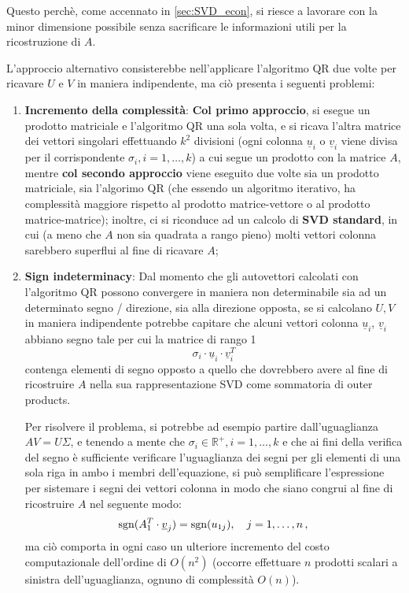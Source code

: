 Questo perchè, come accennato in \ref{sec:SVD_econ}, si riesce a lavorare con la 
minor dimensione possibile senza sacrificare le informazioni utili per la 
ricostruzione di $A$.

L'approccio alternativo consisterebbe nell'applicare l'algoritmo QR due volte 
per ricavare $U$ e $V$ in maniera indipendente, ma ciò presenta i seguenti 
problemi:
\begin{enumerate}
	\item \textbf{Incremento della complessità}: \textbf{Col primo approccio}, si 
esegue un prodotto matriciale e l'algoritmo QR una sola volta, e si ricava 
l'altra matrice dei vettori singolari effettuando $k^2$ divisioni (ogni colonna 
$\underline{u}_i$ o $\underline{v}_i$ viene divisa per il corrispondente 
$\sigma_i, i = 1, \ldots, k$) a cui segue un prodotto con la matrice $A$, mentre 
\textbf{col secondo approccio} viene eseguito due volte sia un prodotto matriciale, 
sia l'algorimo QR (che essendo un algoritmo iterativo, ha complessità maggiore 
rispetto al prodotto matrice-vettore o al prodotto matrice-matrice);
inoltre, ci si riconduce ad un calcolo di \textbf{SVD standard}, in cui (a meno 
che $A$ non sia quadrata a rango pieno) molti vettori colonna sarebbero 
superflui al fine di ricavare $A$;


	\item \textbf{Sign indeterminacy}: Dal momento che gli autovettori calcolati 
con l'algoritmo QR possono convergere in maniera non determinabile sia ad un 
determinato segno / direzione, sia alla direzione opposta, se si calcolano $U,V$ 
in maniera indipendente potrebbe capitare che alcuni vettori colonna 
$\underline{u}_i$, $\underline{v}_i$ abbiano segno tale per cui la matrice di 
rango 1
\begin{equation*}
\sigma_i \cdot \underline{u}_i \cdot \underline{v}_{i}^T
\end{equation*}
contenga elementi di segno opposto a quello che dovrebbero avere al fine di 
ricostruire $A$ nella sua rappresentazione SVD come sommatoria di 
outer products.


Per risolvere il problema, si potrebbe ad esempio partire dall'uguaglianza $A V 
= U \Sigma$, e tenendo a mente che $\sigma_i \in \mathbb{R}^+, i = 1, \ldots, k$ e 
che ai fini della verifica del segno è sufficiente verificare l'uguaglianza dei 
segni per gli elementi di una sola riga in ambo i membri dell'equazione, si può 
semplificare l'espressione per sistemare i segni dei vettori colonna in modo che 
siano congrui al fine di ricostruire $A$ nel seguente modo:
\begin{equation*}
	\operatorname{sgn}(A_{1}^T \cdot \underline{v}_j) = \operatorname{sgn}(u_{1j}), \quad j = 1, \ldots, n \,,
\end{equation*}
 ma ciò comporta in ogni caso un ulteriore incremento del costo computazionale 
dell'ordine di $O(n^2)$ (occorre effettuare $n$ prodotti scalari a sinistra 
dell'uguaglianza, ognuno di complessità $O(n)$).
\end{enumerate}

